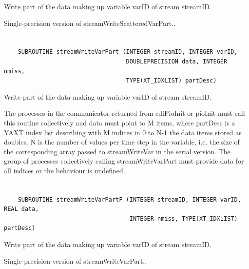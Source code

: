 Write part of the data making up
variable varID of stream streamID.

Single-precision version of streamWriteScatteredVarPart..


\section*{\tt {}}

\begin{verbatim}
    SUBROUTINE streamWriteVarPart (INTEGER streamID, INTEGER varID,
                                   DOUBLEPRECISION data, INTEGER nmiss,
                                   TYPE(XT_IDXLIST) partDesc)
\end{verbatim}

Write part of the data making up variable varID
of stream streamID.

The processes in the communicator returned from cdiPioInit or
pioInit must call this routine collectively and data must point to
M items, where partDesc is a YAXT index list describing with M
indices in 0 to N-1 the data items stored as doubles. N is the
number of values per time step in the variable, i.e. the size of
the corresponding array passed to streamWriteVar in the serial version.
The group of processes collectively calling streamWriteVarPart
must provide data for all indices or the behaviour is undefined..


\section*{\tt {}}

\begin{verbatim}
    SUBROUTINE streamWriteVarPartF (INTEGER streamID, INTEGER varID, REAL data,
                                    INTEGER nmiss, TYPE(XT_IDXLIST) partDesc)
\end{verbatim}

Write part of the data making up variable
varID of stream streamID.

Single-precision version of streamWriteVarPart..


